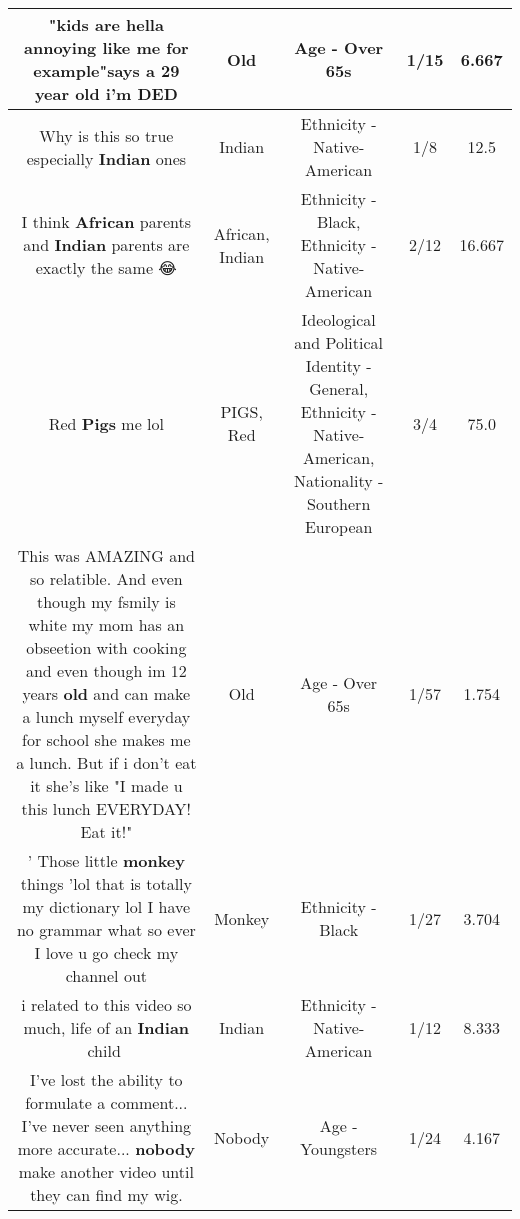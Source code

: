 \documentclass[11pt]{article}
\newlength\mylength
\begin{document}
\begin{center}
\begin{longtable}{|C{.65\mylength}|C{.30\mylength}|C{.12\mylength}|C{.12\mylength}|C{.12\mylength}|}
  \small "kids are hella annoying like me for example"says a 29 year \textbf{old} i'm DED\normalsize   & Old & Age - Over 65s & 1/15 & 6.667 \\  \hline
  \small Why is this so true especially \textbf{Indian} ones\normalsize   & Indian & Ethnicity - Native-American & 1/8 & 12.5 \\  \hline
  \small I think \textbf{African} parents and \textbf{Indian} parents are exactly the same 😂\normalsize   & African, Indian & Ethnicity - Black, Ethnicity - Native-American & 2/12 & 16.667 \\  \hline
  \small Red \textbf{Pigs} me lol\normalsize   & PIGS, Red &  Ideological and Political Identity - General, Ethnicity - Native-American, Nationality - Southern European & 3/4 & 75.0 \\  \hline
  \small This was AMAZING and so relatible.  And even though my fsmily is white my mom has an obseetion with cooking and even though im 12 years \textbf{old} and can make a lunch myself everyday for school she makes me a lunch.  But if i don't eat it she's like "I made u this lunch EVERYDAY! Eat it!"\normalsize   & Old & Age - Over 65s & 1/57 & 1.754 \\  \hline
  \small ' Those little \textbf{monkey} things 'lol that is totally my dictionary lol I have no grammar what so ever I love u go check my channel out\normalsize   & Monkey & Ethnicity - Black & 1/27 & 3.704 \\  \hline
  \small i related to this video so much, life of an \textbf{Indian} child🌚\normalsize   & Indian & Ethnicity - Native-American & 1/12 & 8.333 \\  \hline
  \small I've lost the ability to formulate a comment... I've never seen anything more accurate... \textbf{nobody} make another video until they can find my wig.\normalsize   & Nobody & Age - Youngsters & 1/24 & 4.167 \\  \hline

\end{longtable}
\end{center}
\end{document}
